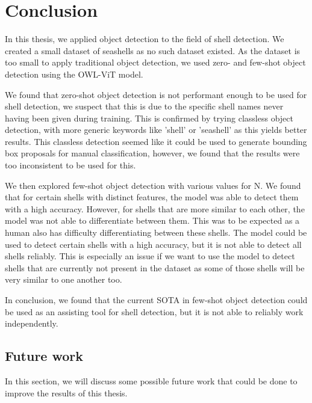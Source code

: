 \chapter{Conclusion}

In this thesis, we applied object detection to the field of shell detection. We created a small dataset of seashells as no such dataset existed. As the dataset is too small to apply traditional object detection, we used zero- and few-shot object detection using the OWL-ViT model.

We found that zero-shot object detection is not performant enough to be used for shell detection, we suspect that this is due to the specific shell names never having been given during training. This is confirmed by trying classless object detection, with more generic keywords like 'shell' or 'seashell' as this yields better results. This classless detection seemed like it could be used to generate bounding box proposals for manual classification, however, we found that the results were too inconsistent to be used for this.

We then explored few-shot object detection with various values for N. We found that for certain shells with distinct features, the model was able to detect them with a high accuracy. However, for shells that are more similar to each other, the model was not able to differentiate between them. This was to be expected as a human also has difficulty differentiating between these shells. The model could be used to detect certain shells with a high accuracy, but it is not able to detect all shells reliably. This is especially an issue if we want to use the model to detect shells that are currently not present in the dataset as some of those shells will be very similar to one another too.

In conclusion, we found that the current SOTA in few-shot object detection could be used as an assisting tool for shell detection, but it is not able to reliably work independently. 


\section*{Future work}
In this section, we will discuss some possible future work that could be done to improve the results of this thesis.

